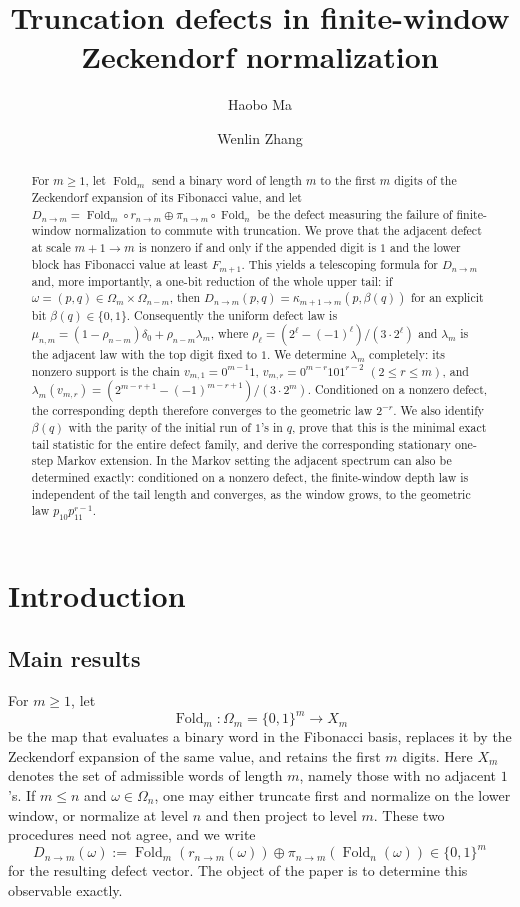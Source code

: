 \documentclass[11pt,reqno]{amsart}
\title[Truncation defects in finite-window Zeckendorf normalization]{Truncation defects in finite-window Zeckendorf normalization}
\author{Haobo Ma}
\author{Wenlin Zhang}
\date{}
\numberwithin{equation}{section}
\theoremstyle{plain}
\theoremstyle{definition}
\theoremstyle{remark}
\DeclareMathOperator{\Fold}{Fold}
\begin{document}
\begin{abstract}
For $m\ge 1$, let $\Fold_m$ send a binary word of length $m$ to the first $m$
digits of the Zeckendorf expansion of its Fibonacci value, and let
$D_{n\to m}=\Fold_m\circ r_{n\to m}\oplus \pi_{n\to m}\circ \Fold_n$ be the
defect measuring the failure of finite-window normalization to commute with
truncation.  We prove that the adjacent defect at scale $m+1\to m$ is nonzero
if and only if the appended digit is $1$ and the lower block has Fibonacci
value at least $F_{m+1}$.  This yields a telescoping formula for $D_{n\to m}$
and, more importantly, a one-bit reduction of the whole upper tail: if
$\omega=(p,q)\in\Omega_m\times\Omega_{n-m}$, then
$D_{n\to m}(p,q)=\kappa_{m+1\to m}(p,\beta(q))$ for an explicit bit
$\beta(q)\in\{0,1\}$.  Consequently the uniform defect law is
$\mu_{n,m}=(1-\rho_{n-m})\delta_0+\rho_{n-m}\lambda_m$, where
$\rho_\ell=(2^\ell-(-1)^\ell)/(3\cdot 2^\ell)$ and $\lambda_m$ is the adjacent
law with the top digit fixed to $1$.  We determine $\lambda_m$ completely: its
nonzero support is the chain $v_{m,1}=0^{m-1}1$,
$v_{m,r}=0^{m-r}10 1^{r-2}$ $(2\le r\le m)$, and
$\lambda_m(v_{m,r})=(2^{m-r+1}-(-1)^{m-r+1})/(3\cdot 2^m)$.  Conditioned on a
nonzero defect, the corresponding depth therefore converges to the geometric
law $2^{-r}$.  We also identify $\beta(q)$ with the parity of the initial run
of $1$'s in $q$, prove that this is the minimal exact tail statistic for the
entire defect family, and derive the corresponding stationary one-step Markov
extension.  In the Markov setting the adjacent spectrum can also be determined
exactly: conditioned on a nonzero defect, the finite-window depth law is
independent of the tail length and converges, as the window grows, to the
geometric law $p_{10}p_{11}^{r-1}$.
\end{abstract}

\maketitle

\section{Introduction}

\subsection{Main results}

For $m\ge 1$, let
\[
\Fold_m:\Omega_m=\{0,1\}^m\longrightarrow X_m
\]
be the map that evaluates a binary word in the Fibonacci basis, replaces it by
the Zeckendorf expansion of the same value, and retains the first $m$ digits.
Here $X_m$ denotes the set of admissible words of length $m$, namely those
with no adjacent $1$'s.  If $m\le n$ and $\omega\in\Omega_n$, one may either
truncate first and normalize on the lower window, or normalize at level $n$
and then project to level $m$.  These two procedures need not agree, and we
write
\[
D_{n\to m}(\omega)
:=
\Fold_m(r_{n\to m}(\omega))
\oplus
\pi_{n\to m}(\Fold_n(\omega))
\in \{0,1\}^m
\]
for the resulting defect vector.  The object of the paper is to determine this
observable exactly.
\end{document}
